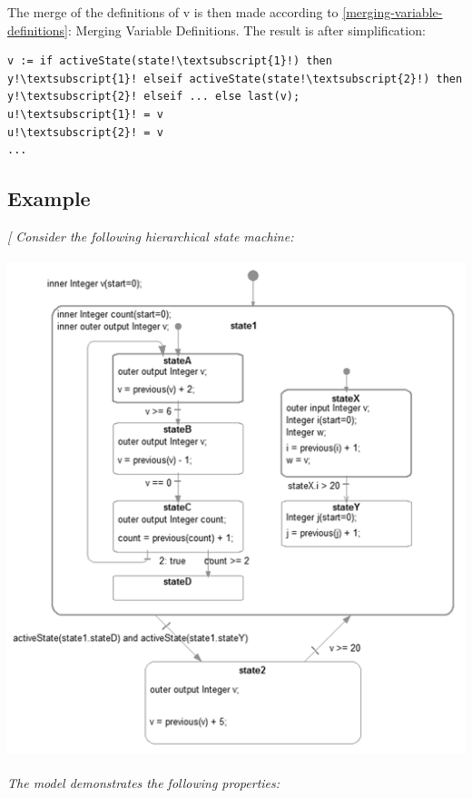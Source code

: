 \documentclass[10pt,a4paper]{report}
\def\doublelabel#1{\label{#1}}
\begin{document}
The merge of the definitions of v is then made according to \ref{merging-variable-definitions}: 
Merging Variable Definitions. The result is after
simplification:
\begin{lstlisting}[language=modelica,escapechar=!]
v := if activeState(state!\textsubscript{1}!) then y!\textsubscript{1}! elseif activeState(state!\textsubscript{2}!) then y!\textsubscript{2}! elseif ... else last(v); 
u!\textsubscript{1}! = v
u!\textsubscript{2}! = v
...
\end{lstlisting}

\subsection{Example}\doublelabel{example}

\emph{{[} Consider the following hierarchical state machine:}

\includegraphics[width=5.34375in,height=5.72917in]{media/statemachine2}

\emph{The model demonstrates the following properties:}
\end{document}
